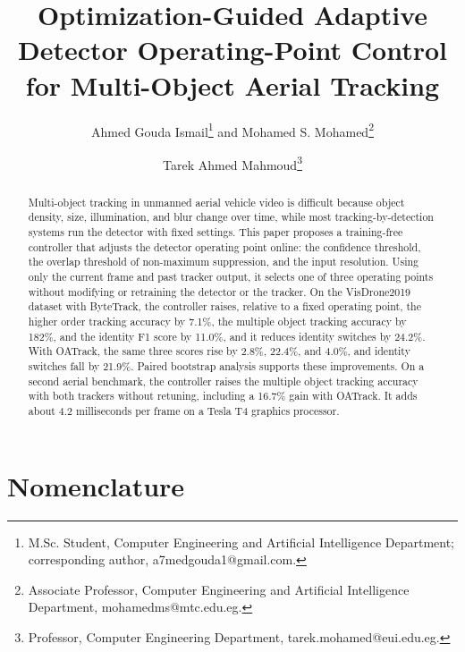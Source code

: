 \documentclass[journal]{new-aiaa}
\title{Optimization-Guided Adaptive Detector Operating-Point Control for Multi-Object Aerial Tracking}
\author{Ahmed Gouda Ismail\footnote{M.Sc. Student, Computer Engineering and Artificial Intelligence Department; corresponding author, a7medgouda1@gmail.com.} and Mohamed S. Mohamed\footnote{Associate Professor, Computer Engineering and Artificial Intelligence Department, mohamedms@mtc.edu.eg.}}
\affil{Military Technical College, Cairo, Egypt}
\author{Tarek Ahmed Mahmoud\footnote{Professor, Computer Engineering Department, tarek.mohamed@eui.edu.eg.}}
\affil{Egypt University of Informatics, Cairo, Egypt}
\begin{document}
\maketitle

\begin{abstract}
Multi-object tracking in unmanned aerial vehicle video is difficult because object density, size, illumination, and blur change over time, while most tracking-by-detection systems run the detector with fixed settings. This paper proposes a training-free controller that adjusts the detector operating point online: the confidence threshold, the overlap threshold of non-maximum suppression, and the input resolution. Using only the current frame and past tracker output, it selects one of three operating points without modifying or retraining the detector or the tracker. On the VisDrone2019 dataset with ByteTrack, the controller raises, relative to a fixed operating point, the higher order tracking accuracy by 7.1\%, the multiple object tracking accuracy by 182\%, and the identity F1 score by 11.0\%, and it reduces identity switches by 24.2\%. With OATrack, the same three scores rise by 2.8\%, 22.4\%, and 4.0\%, and identity switches fall by 21.9\%. Paired bootstrap analysis supports these improvements. On a second aerial benchmark, the controller raises the multiple object tracking accuracy with both trackers without retuning, including a 16.7\% gain with OATrack. It adds about 4.2 milliseconds per frame on a Tesla T4 graphics processor.
\end{abstract}

\section*{Nomenclature}
\end{document}
